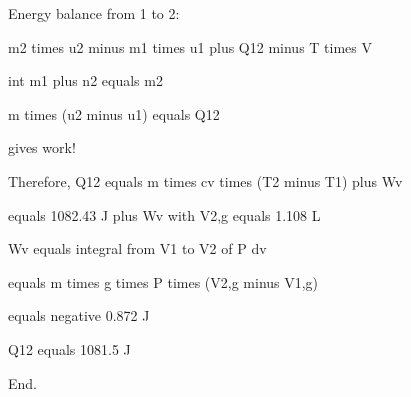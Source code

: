 Energy balance from 1 to 2:

m2 times u2 minus m1 times u1 plus Q12 minus T times V

int m1 plus n2 equals m2

m times (u2 minus u1) equals Q12

gives work!

Therefore, Q12 equals m times cv times (T2 minus T1) plus Wv

equals 1082.43 J plus Wv with V2,g equals 1.108 L

Wv equals integral from V1 to V2 of P dv

equals m times g times P times (V2,g minus V1,g)

equals negative 0.872 J

Q12 equals 1081.5 J

End.